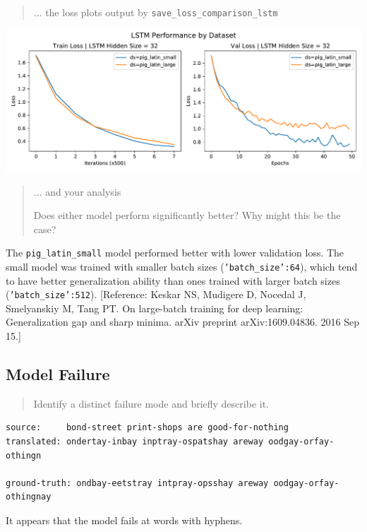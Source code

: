 \documentclass{article}
\begin{document}
\begin{quote}
... the loss plots output by \texttt{save\_loss\_comparison\_lstm}
\end{quote}

\includegraphics[width=\linewidth]{loss_plot_lstm}

\begin{quote}
... and your analysis

Does  either  model perform significantly better?  Why might this be the case?
\end{quote}

The \texttt{pig\_latin\_small} model performed better with lower validation loss. The small model was trained with smaller batch sizes (\texttt{'batch\_size':64}), which tend to have better generalization ability than ones trained with larger batch sizes (\texttt{'batch\_size':512}). [Reference: Keskar NS, Mudigere D, Nocedal J, Smelyanskiy M, Tang PT. On large-batch training for deep learning: Generalization gap and sharp minima. arXiv preprint arXiv:1609.04836. 2016 Sep 15.]



\subsection*{Model Failure}

\begin{quote}
Identify a distinct failure mode and briefly describe it.
\end{quote}

\begin{lstlisting}
source:		bond-street print-shops are good-for-nothing 
translated:	ondertay-inbay inptray-ospatshay areway oodgay-orfay-othingn

ground-truth: ondbay-eetstray intpray-opsshay areway oodgay-orfay-othingnay
\end{lstlisting}

It appears that the model fails at words with hyphens. %
\end{document}
